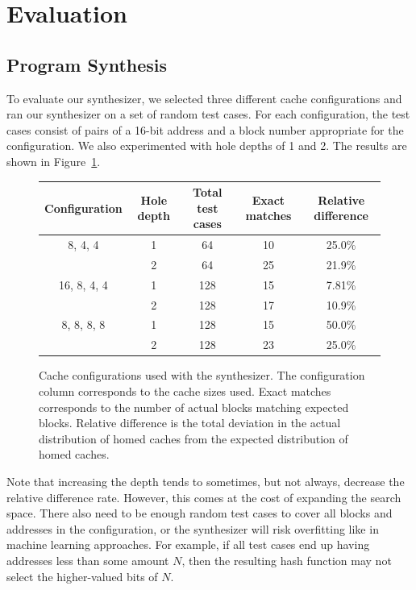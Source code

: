 \section{Evaluation}
\label{sec:Eval}

\subsection{Program Synthesis}

To evaluate our synthesizer, we selected three different cache configurations
and ran our synthesizer on a set of random test cases. For each configuration,
the test cases consist of pairs of a 16-bit address and a block number
appropriate for the configuration. We also experimented with hole depths of 1
and 2. The results are shown in Figure~\ref{Fig:synth_results}.

\begin{figure}[h]
  \centering
  \begin{tabular}{|c|c|c|c|c|}
    \hline
    Configuration & Hole depth & Total test cases & Exact matches & Relative difference
    \\ \hline
    8, 4, 4     & 1 & 64  & 10 & 25.0\% \\
                & 2 & 64  & 25 & 21.9\% \\ \hline
    16, 8, 4, 4 & 1 & 128 & 15 & 7.81\% \\
                & 2 & 128 & 17 & 10.9\% \\ \hline
    8, 8, 8, 8  & 1 & 128 & 15 & 50.0\% \\
                & 2 & 128 & 23 & 25.0\% \\ \hline
  \end{tabular}
  \caption{Cache configurations used with the synthesizer. The configuration
    column corresponds to the cache sizes used. Exact matches corresponds to the
    number of actual blocks matching expected blocks. Relative difference is the
    total deviation in the actual distribution of homed caches from the expected
    distribution of homed caches.}
  \label{Fig:synth_results}
\end{figure}

Note that increasing the depth tends to sometimes, but not always, decrease the
relative difference rate. However, this comes at the cost of expanding the
search space. There also need to be enough random test cases to cover all blocks
and addresses in the configuration, or the synthesizer will risk overfitting
like in machine learning approaches. For example, if all test cases end up
having addresses less than some amount $N$, then the resulting hash function may
not select the higher-valued bits of $N$.


